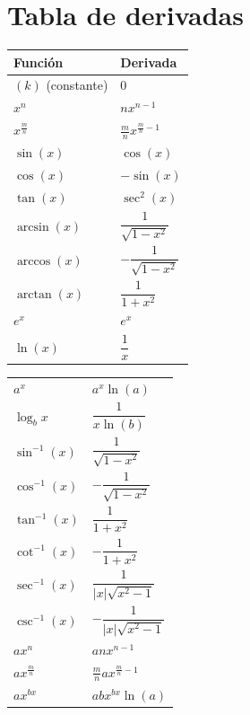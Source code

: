 \documentclass[12pt,a4paper,fleqn]{article}
\begin{document}
\section*{Tabla de derivadas}
\begin{center}
	\noindent
	\begin{minipage}{0.5\textwidth}
		\centering
		\begin{tabular}{|>{\centering\arraybackslash}m{3.5cm}|>{\centering\arraybackslash}m{3cm}|}
			\hline
			Función           & Derivada                       \\
			\hline
			$(k)$ (constante) & $0$                            \\
			$x^n$             & $nx^{n-1}$                     \\
			$x^\frac{m}{n}$   & $\frac{m}{n}x^{\frac{m}{n}-1}$ \\
			$\sin(x)$         & $\cos(x)$                      \\
			$\cos(x)$         & $-\sin(x)$                     \\
			$\tan(x)$         & $\sec^2(x)$                    \\
			$\arcsin(x)$      & $\dfrac{1}{\sqrt{1-x^2}}$      \\
			$\arccos(x)$      & $-\dfrac{1}{\sqrt{1-x^2}}$     \\
			$\arctan(x)$      & $\dfrac{1}{1+x^2}$             \\
			$e^x$             & $e^x$                          \\
			$\ln(x)$          & $\dfrac{1}{x}$                 \\[10px]
			\hline
		\end{tabular}
	\end{minipage}%
	\begin{minipage}{0.5\textwidth}
		\centering
		\begin{tabular}{|>{\centering\arraybackslash}m{3.5cm}|>{\centering\arraybackslash}m{3cm}|}
			\hline
			$a^x$              & $a^x \ln(a)$                    \\
			$\log_b{x}$        & $\dfrac{1}{x \ln(b)}$           \\
			$\sin^{-1}(x)$     & $\dfrac{1}{\sqrt{1-x^2}}$       \\
			$\cos^{-1}(x)$     & $-\dfrac{1}{\sqrt{1-x^2}}$      \\
			$\tan^{-1}(x)$     & $\dfrac{1}{1+x^2}$              \\
			$\cot^{-1}(x)$     & $-\dfrac{1}{1+x^2}$             \\
			$\sec^{-1}(x)$     & $\dfrac{1}{|x|\sqrt{x^2-1}}$    \\
			$\csc^{-1}(x)$     & $-\dfrac{1}{|x|\sqrt{x^2-1}}$   \\
			$ax^n$             & $anx^{n-1}$                     \\
			$ax^{\frac{m}{n}}$ & $\frac{m}{n}ax^{\frac{m}{n}-1}$ \\
			$ax^{bx}$          & $abx^{bx} \ln(a)$               \\[9px]
			\hline
		\end{tabular}
	\end{minipage}
\end{center}
\end{document}
